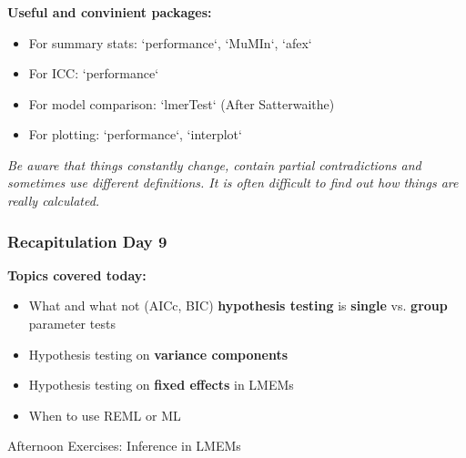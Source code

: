 \documentclass{beamer}
\begin{document}
\begin{frame}
    \frametitle{}
    \large
    \textbf{Useful and convinient packages:}
    \begin{itemize}
        \item For summary stats: `performance`, `MuMIn`, `afex`
        \item For ICC: `performance`
        \item For model comparison: `lmerTest` (After Satterwaithe)
        \item For plotting: `performance`, `interplot` 
    \end{itemize}
    \vspace{0.2cm}

    \textit{Be aware that things constantly change, contain partial contradictions and sometimes use different definitions. It is often difficult to find out how things are really calculated.}
\end{frame}

\begin{frame}
    \frametitle{Recapitulation Day 9}
    \large
    \textbf{Topics covered today:}
    \begin{itemize}
        \item What and what not (AICc, BIC) \textbf{hypothesis testing} is \textbf{single} vs. \textbf{group} parameter tests
        \item Hypothesis testing on \textbf{variance components}
        \item Hypothesis testing on \textbf{fixed effects} in LMEMs
        \item When to use REML or ML
    \end{itemize}
    \vspace{0.2cm}
    
    Afternoon Exercises: Inference in LMEMs
\end{frame}
\end{document}
